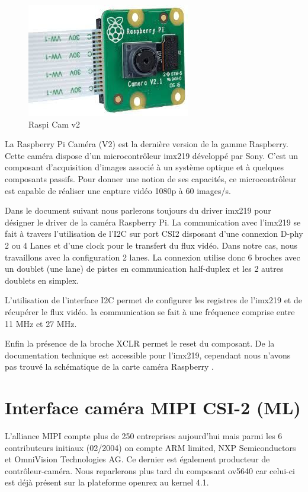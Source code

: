 \begin{figure}[!htb]
    \centering
    \includegraphics[trim={0cm 0cm 0cm 0cm},clip,scale=0.4]{Figures/camrpi.png}
    \decoRule
    \caption{Raspi Cam v2} \label{fig:camrpi}
\end{figure}

La Raspberry Pi Caméra (V2) est la dernière version de la gamme Raspberry. Cette
caméra dispose d’un microcontrôleur imx219 développé par Sony. C’est un composant
d’acquisition d’images associé à un système optique et à quelques composants passifs.
Pour donner une notion de ses capacités, ce microcontrôleur est capable de réaliser une
capture vidéo 1080p à 60 images/s. \medskip

Dans le document suivant nous parlerons toujours du driver imx219 pour désigner le driver
de la caméra Raspberry Pi. La communication avec l’imx219 se fait à travers l’utilisation
de l’I2C sur port CSI2 disposant d’une connexion D-phy 2 ou 4 Lanes et d’une clock pour
le transfert du flux vidéo. Dans notre cas, nous travaillons avec la configuration 2 lanes. La
connexion utilise donc 6 broches avec un doublet (une lane) de pistes en communication
half-duplex et les 2 autres doublets en simplex.\medskip

L’utilisation de l’interface I2C permet de configurer les registres de l’imx219 et de
récupérer le flux vidéo. la communication se fait à une fréquence comprise entre 11 MHz
et 27 MHz.\medskip

Enfin la présence de la broche XCLR permet le reset du composant.
De la documentation technique est accessible pour l’imx219, cependant nous n’avons pas
trouvé la schématique de la carte caméra Raspberry .

\section{Interface caméra MIPI CSI-2 (ML)}

L’alliance MIPI compte plus de 250 entreprises aujourd’hui mais parmi les 6 contributeurs
initiaux (02/2004) on compte ARM limited, NXP Semiconductors et OmniVision
Technologies AG. Ce dernier est également producteur de contrôleur-caméra. Nous
reparlerons plus tard du composant ov5640 car celui-ci est déjà présent sur la plateforme
openrex au kernel 4.1. \medskip

